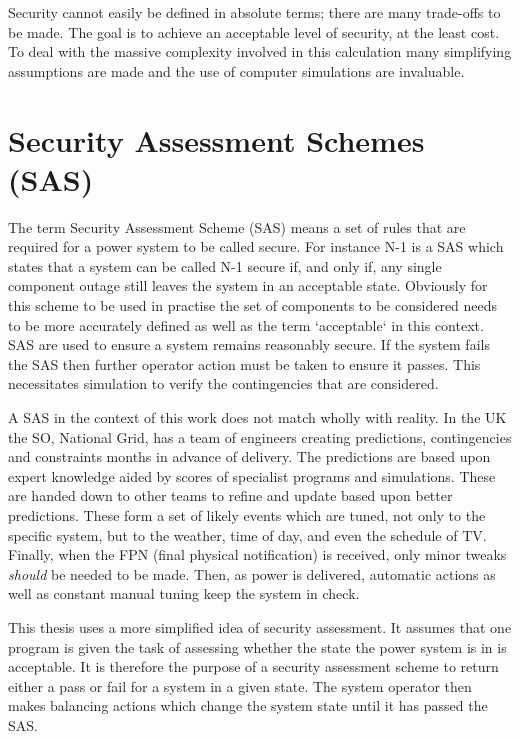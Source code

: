 \documentclass[a4paper,oneside,12pt]{report}
\begin{document}
Security cannot easily be defined in absolute terms; there are many trade-offs to be made. The goal is to achieve an acceptable level of security, at the least cost. To deal with the massive complexity involved in this calculation many simplifying assumptions are made and the use of computer simulations are invaluable.

\section{Security Assessment Schemes (SAS)}

The term Security Assessment Scheme (SAS) means a set of rules that are required for a power system to be called secure. For instance N-1 is a SAS which states that a system can be called N-1 secure if, and only if, any single component outage still leaves the system in an acceptable state. Obviously for this scheme to be used in practise the set of components to be considered needs to be more accurately defined as well as the term `acceptable` in this context. SAS are used to ensure a system remains reasonably secure. If the system fails the SAS then further operator action must be taken to ensure it passes. This necessitates simulation to verify the contingencies that are considered.

A SAS in the context of this work does not match wholly with reality. In the UK the SO, National Grid, has a team of engineers creating predictions, contingencies and constraints months in advance of delivery. The predictions are based upon expert knowledge aided by scores of specialist programs and simulations. These are handed down to other teams to refine and update based upon better predictions. These form a set of likely events which are tuned, not only to the specific system, but to the weather, time of day, and even the schedule of TV. Finally, when the FPN (final physical notification) is received, only minor tweaks \emph{should} be needed to be made. Then, as power is delivered, automatic actions as well as constant manual tuning keep the system in check.

This thesis uses a more simplified idea of security assessment. It assumes that one program is given the task of assessing whether the state the power system is in is acceptable. It is therefore the purpose of a security assessment scheme to return either a pass or fail for a system in a given state. The system operator then makes balancing actions which change the system state until it has passed the SAS.
\end{document}
